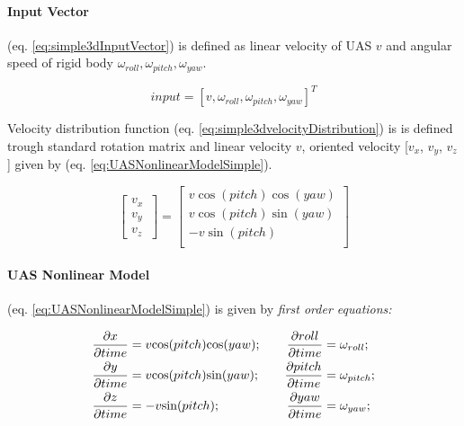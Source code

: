 \paragraph{Input Vector} (eq. \ref{eq:simple3dInputVector}) is defined as linear velocity of UAS $v$ and angular speed of rigid body $\omega_{roll}, \omega_{pitch},\omega_{yaw}$.

\begin{equation}\label{eq:simple3dInputVector}
    input = \left [ v, \omega_{roll}, \omega_{pitch},\omega_{yaw}\right ]^T
\end{equation}


\noindent Velocity distribution function (eq. \ref{eq:simple3dvelocityDistribution})  is is defined trough standard rotation matrix  and linear velocity $v$, oriented velocity [$v_x$, $v_y$, $v_z$] given by (eq. \ref{eq:UASNonlinearModelSimple}).

\begin{equation}\label{eq:simple3dvelocityDistribution}
    \begin{bmatrix}
    v_x\\
    v_y\\
    v_z\
    \end{bmatrix}
    =
    \begin{bmatrix}
         v\cos(pitch)\cos(yaw)\\
         v\cos(pitch)\sin(yaw)\\
         -v\sin(pitch)\\
    \end{bmatrix}
\end{equation}

\newpage
\paragraph{UAS Nonlinear Model} (eq. \ref{eq:UASNonlinearModelSimple}) is given by \emph{first order equations:}

\begin{equation}\label{eq:UASNonlinearModelSimple}
    \begin{aligned}
        \frac{\partial x}{\partial time} &= v\cos(pitch)\cos(yaw);\\
        \frac{\partial y}{\partial time} &= v\cos(pitch)\sin(yaw);\\
        \frac{\partial z}{\partial time} &= -v\sin(pitch);\\
    \end{aligned}\\\quad\quad
    \begin{aligned}
        \frac{\partial roll}{\partial time} &= \omega_{roll};\\
        \frac{\partial pitch}{\partial time} &= \omega_{pitch};\\
        \frac{\partial yaw}{\partial time} &= \omega_{yaw};\\
    \end{aligned}
\end{equation}

